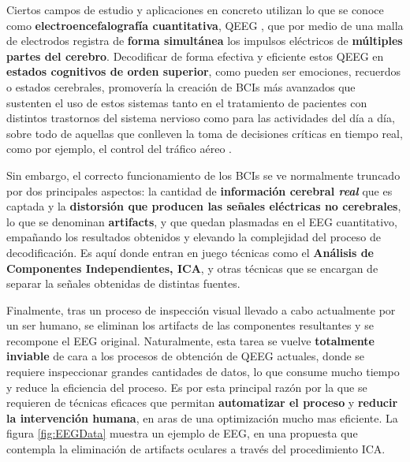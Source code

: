 Ciertos campos de estudio y aplicaciones en concreto utilizan lo que se conoce como \textbf{electroencefalografía cuantitativa}, QEEG \cite{QEEG}, que por medio de una malla de electrodos registra de \textbf{forma simultánea} los impulsos eléctricos de \textbf{múltiples partes del cerebro}. Decodificar de forma efectiva y eficiente estos QEEG en \textbf{estados cognitivos de orden superior}\cite{EvolutionaryBigOpt}, como pueden ser emociones, recuerdos o estados cerebrales, promovería la creación de BCIs más avanzados que sustenten el uso de estos sistemas tanto en el tratamiento de pacientes con distintos trastornos del sistema nervioso como para las actividades del día a día, sobre todo de aquellas que conlleven la toma de decisiones críticas en tiempo real, como por ejemplo, el control del tráfico aéreo \cite{EEG-AirTraffic}.

Sin embargo, el correcto funcionamiento de los BCIs se ve normalmente truncado por dos principales aspectos: la cantidad de \textbf{información cerebral \textit{real}} que es captada y la \textbf{distorsión que producen las señales eléctricas no cerebrales}, lo que se denominan \textbf{artifacts}, y que quedan plasmadas en el EEG cuantitativo, empañando los resultados obtenidos y elevando la complejidad del proceso de decodificación. Es aquí donde entran en juego técnicas como el \textbf{Análisis de Componentes Independientes, ICA}, y otras técnicas que se encargan de separar la señales obtenidas de distintas fuentes. 

Finalmente, tras un proceso de inspección visual llevado a cabo actualmente por un ser humano, se eliminan los artifacts de las componentes resultantes y se recompone el EEG original. Naturalmente, esta tarea se vuelve \textbf{totalmente inviable} de cara a los procesos de obtención de QEEG actuales, donde se requiere inspeccionar grandes cantidades de datos, lo que consume mucho tiempo y reduce la eficiencia del proceso. Es por esta principal razón por la que se requieren de técnicas eficaces que permitan \textbf{automatizar el proceso} y \textbf{reducir la intervención humana}, en aras de una optimización mucho mas eficiente. La figura \ref{fig:EEGData} muestra un ejemplo de EEG, en una propuesta que contempla la eliminación de artifacts oculares a través del procedimiento ICA.

